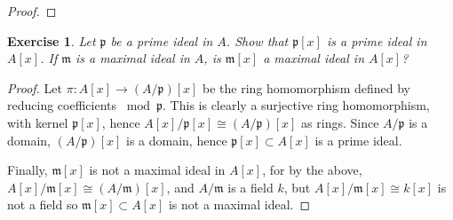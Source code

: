 \documentclass[12pt,letterpaper]{article}
\newtheorem{problem}{Exercise}[section]
\theoremstyle{definition}
\theoremstyle{remark}
\numberwithin{figure}{problem}
\numberwithin{equation}{section}
\begin{document}
\begin{proof}
\end{proof}

\begin{problem}
  Let
  $\mathfrak{p}$ be a prime ideal in
  $A$.
  Show that
  $\mathfrak{p}[x]$ is a prime ideal in
  $A[x]$.
  If
  $\mathfrak{m}$ is a maximal ideal in
  $A$, is
  $\mathfrak{m}[x]$ a maximal ideal in
  $A[x]$?
\end{problem}
\begin{proof}
  Let
  $\pi\colon A[x] \to
  (A/\mathfrak{p})[x]$ be the ring homomorphism defined by reducing coefficients
  $\bmod
  \mathfrak{p}$.
  This is clearly a surjective ring homomorphism, with kernel
  $\mathfrak{p}[x]$, hence
  $A[x]/\mathfrak{p}[x] \cong
  (A/\mathfrak{p})[x]$ as rings.
  Since
  $A/\mathfrak{p}$ is a domain,
  $(A/\mathfrak{p})[x]$ is a domain, hence
  $\mathfrak{p}[x] \subset
  A[x]$ is a prime ideal.
  \par Finally,
  $\mathfrak{m}[x]$ is not a maximal ideal in
  $A[x]$, for by the above,
  $A[x]/\mathfrak{m}[x] \cong
  (A/\mathfrak{m})[x]$, and
  $A/\mathfrak{m}$ is a field
  $k$, but
  $A[x]/\mathfrak{m}[x] \cong
  k[x]$ is not a field so
  $\mathfrak{m}[x] \subset
  A[x]$ is not a maximal ideal.
\end{proof}
\end{document}
